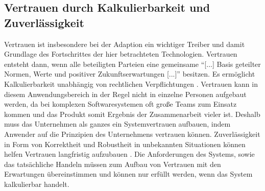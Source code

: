 \subsection{Vertrauen durch Kalkulierbarkeit und Zuverlässigkeit}\label{sub:vertrauen}
Vertrauen ist insbesondere bei der Adaption ein wichtiger Treiber und damit Grundlage des Fortschrittes der hier betrachteten Technologien.
Vertrauen entsteht dann, wenn alle beteiligten Parteien eine gemeinsame \enquote{[...] Basis geteilter Normen, Werte und positiver Zukunftserwartungen [...]}\cite[S. 61]{gilberta} besitzen.
Es ermöglicht Kalkulierbarkeit unabhängig von rechtlichen Verpflichtungen \cite[S. 61 ff.]{gilberta}.
Vertrauen kann in diesem Anwendungsbereich in der Regel nicht in einzelne Personen aufgebaut werden, da bei komplexen Softwaresystemen oft große Teams zum Einsatz kommen und das Produkt somit Ergebnis der Zusammenarbeit vieler ist.
Deshalb muss das Unternehmen als ganzes ein Systemvertrauen aufbauen, indem Anwender auf die Prinzipien des Unternehmens vertrauen können.
Zuverlässigkeit in Form von Korrektheit und Robustheit in unbekannten Situationen können helfen Vertrauen langfristig aufzubauen \cite[S. 13]{avizienis2004}.
Die Anforderungen des Systems, sowie das tatsächliche Handeln müssen zum Aufbau von Vertrauen mit den Erwartungen übereinstimmen und können nur erfüllt werden, wenn das System kalkulierbar handelt.

